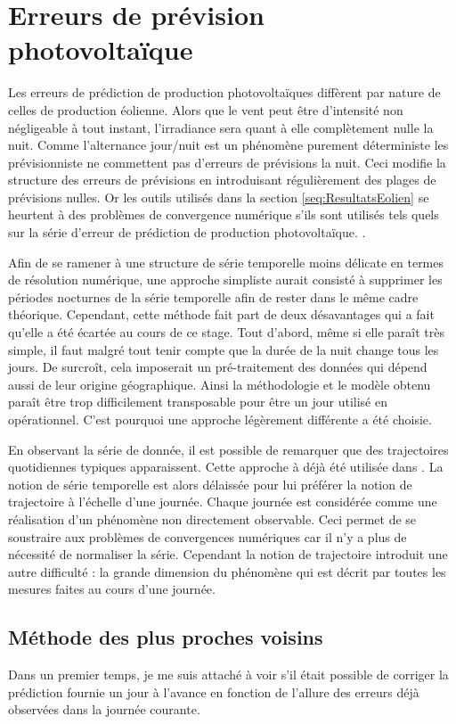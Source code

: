 \documentclass[12pt]{report}
\begin{document}
\chapter{Erreurs de prévision photovoltaïque}
Les erreurs de prédiction de production photovoltaïques diffèrent par nature de celles de production éolienne. Alors que le vent peut être d'intensité non négligeable à tout instant, l'irradiance sera quant à elle complètement nulle la nuit. Comme l'alternance jour/nuit est un phénomène purement déterministe les prévisionniste ne commettent pas d'erreurs de prévisions la nuit. Ceci modifie la structure des erreurs de prévisions en introduisant régulièrement des plages de prévisions nulles. Or les outils utilisés dans la section \ref{seq:ResultatsEolien} se heurtent à des problèmes de convergence numérique s'ils sont utilisés tels quels sur la série d'erreur de prédiction de production photovoltaïque. .

Afin de se ramener à une structure de série temporelle moins délicate en termes de résolution numérique, une approche simpliste aurait consisté à supprimer les périodes nocturnes de la série temporelle afin de rester dans le même cadre théorique. Cependant, cette méthode fait part de deux désavantages qui a fait qu'elle a été écartée au cours de ce stage. Tout d'abord, même si elle paraît très simple, il faut malgré tout tenir compte que la durée de la nuit change tous les jours. De surcroît, cela imposerait un pré-traitement des données qui dépend aussi de leur origine géographique. Ainsi la méthodologie et le modèle obtenu paraît être trop difficilement transposable pour être un jour utilisé en opérationnel. C'est pourquoi une approche légèrement différente a été choisie.

En observant la série de donnée, il est possible de remarquer que des trajectoires quotidiennes typiques apparaissent. Cette approche à déjà été utilisée dans \cite{latimier_gestion_2016}. La notion de série temporelle est alors délaissée pour lui préférer la notion de trajectoire à l'échelle d'une journée. Chaque journée est considérée comme une réalisation d'un phénomène non directement observable. Ceci permet de se soustraire aux problèmes de convergences numériques car il n'y a plus de nécessité de normaliser la série. Cependant la notion de trajectoire introduit une autre difficulté : la grande dimension du phénomène qui est décrit par toutes les mesures faites au cours d'une journée.

\section{Méthode des plus proches voisins}
Dans un premier temps, je me suis attaché à voir s'il était possible de corriger la prédiction fournie un jour à l'avance en fonction de l'allure des erreurs déjà observées dans la journée courante.
\end{document}
